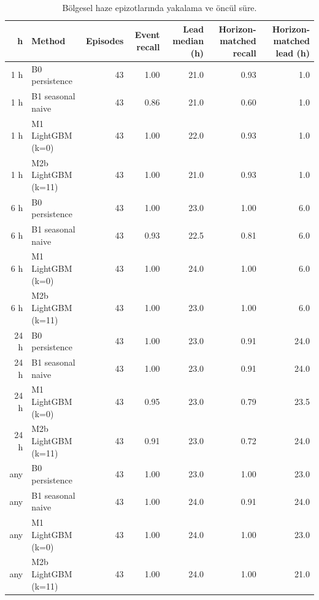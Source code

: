 \begin{table}[t]
\caption{Bölgesel haze epizotlarında yakalama ve öncül süre.}
\label{tab:rq2_haze}
\centering\footnotesize
\begin{tabular}{rlrrrrr}
\toprule
h & Method & Episodes & Event recall & Lead median (h) & Horizon-matched recall & Horizon-matched lead (h) \\
\midrule
1 h & B0 persistence & 43 & 1.00 & 21.0 & 0.93 & 1.0 \\
1 h & B1 seasonal naive & 43 & 0.86 & 21.0 & 0.60 & 1.0 \\
1 h & M1 LightGBM (k=0) & 43 & 1.00 & 22.0 & 0.93 & 1.0 \\
1 h & M2b LightGBM (k=11) & 43 & 1.00 & 21.0 & 0.93 & 1.0 \\
6 h & B0 persistence & 43 & 1.00 & 23.0 & 1.00 & 6.0 \\
6 h & B1 seasonal naive & 43 & 0.93 & 22.5 & 0.81 & 6.0 \\
6 h & M1 LightGBM (k=0) & 43 & 1.00 & 24.0 & 1.00 & 6.0 \\
6 h & M2b LightGBM (k=11) & 43 & 1.00 & 23.0 & 1.00 & 6.0 \\
24 h & B0 persistence & 43 & 1.00 & 23.0 & 0.91 & 24.0 \\
24 h & B1 seasonal naive & 43 & 1.00 & 23.0 & 0.91 & 24.0 \\
24 h & M1 LightGBM (k=0) & 43 & 0.95 & 23.0 & 0.79 & 23.5 \\
24 h & M2b LightGBM (k=11) & 43 & 0.91 & 23.0 & 0.72 & 24.0 \\
any & B0 persistence & 43 & 1.00 & 23.0 & 1.00 & 23.0 \\
any & B1 seasonal naive & 43 & 1.00 & 24.0 & 0.91 & 24.0 \\
any & M1 LightGBM (k=0) & 43 & 1.00 & 24.0 & 1.00 & 23.0 \\
any & M2b LightGBM (k=11) & 43 & 1.00 & 24.0 & 1.00 & 21.0 \\
\bottomrule
\end{tabular}
\end{table}
